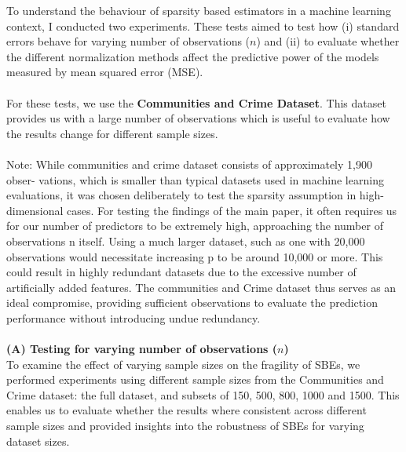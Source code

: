 To understand the behaviour of sparsity based estimators in a machine learning context, I conducted two experiments. These tests aimed to test how (i) standard errors behave for varying number of observations ($n$) and (ii) to evaluate whether the different normalization methods affect the predictive power of the models measured by mean squared error (MSE). \\
\\
For these tests, we use the \textbf{Communities and Crime Dataset}. This dataset provides us with a large number of observations which is useful to evaluate how the results change for different sample sizes.\\
\\
Note: While communities and crime dataset consists of approximately 1,900 obser-
vations, which is smaller than typical datasets used in machine learning evaluations,
it was chosen deliberately to test the sparsity assumption in high-dimensional cases.
For testing the findings of the main paper, it often requires us for our number of predictors to be extremely high, approaching the number of observations n itself. Using a much larger dataset, such as one with 20,000 observations would necessitate increasing p to be around 10,000 or more. This could result in highly redundant datasets due to the excessive number of artificially added features. The communities and Crime dataset thus serves as an ideal compromise, providing sufficient observations to evaluate the prediction performance without introducing undue redundancy.\\
\\
\textbf{(A) Testing for varying number of observations ($n$)}\\
To examine the effect of varying sample sizes on the fragility of SBEs, we
performed experiments using different sample sizes from the Communities
and Crime dataset: the full dataset, and subsets of 150, 500, 800, 1000 and 1500. This enables us to evaluate whether the results where consistent
across different sample sizes and provided insights into the robustness of SBEs for
varying dataset sizes. \\
\begin{table}[h!]
\renewcommand{\arraystretch}{1.5}
\centering
\small
{}
\caption{Treatment Standard Error for Communities and crime dataset}
\label{table:1}
\end{table}

